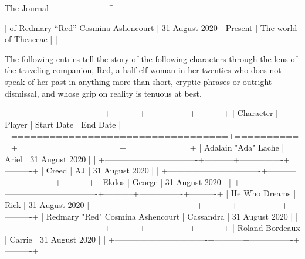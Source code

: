 The Journal
^^^^^^^^^^^^^^^^^^^^^^^^^^^^^^^^^^^^^^^^^^^^^^^^^^^^^^^^^^^^^^^^^^^^^^^^^^^^

| of Redmary “Red” Cosmina Ashencourt
| 31 August 2020 - Present
| The world of Theaceae
|
|

The following entries tell the story of the following characters through the lens of the traveling companion, Red, a half elf woman in her twenties who does not speak of her past in anything more than short, cryptic phrases or outright dismissal, and whose grip on reality is tenuous at best.

+----------------------------------+-----------+----------------+----------+
| Character                        | Player    | Start Date     | End Date |
+==================================+===========+================+==========+
| Adalain "Ada" Lache              | Ariel     | 31 August 2020 |          |
+----------------------------------+-----------+----------------+----------+
| Creed                            | AJ        | 31 August 2020 |          |
+----------------------------------+-----------+----------------+----------+
| Ekdos                            | George    | 31 August 2020 |          |
+----------------------------------+-----------+----------------+----------+
| He Who Dreams                    | Rick      | 31 August 2020 |          |
+----------------------------------+-----------+----------------+----------+
| Redmary "Red" Cosmina Ashencourt | Cassandra | 31 August 2020 |          |
+----------------------------------+-----------+----------------+----------+
| Roland Bordeaux                  | Carrie    | 31 August 2020 |          |
+----------------------------------+-----------+----------------+----------+
